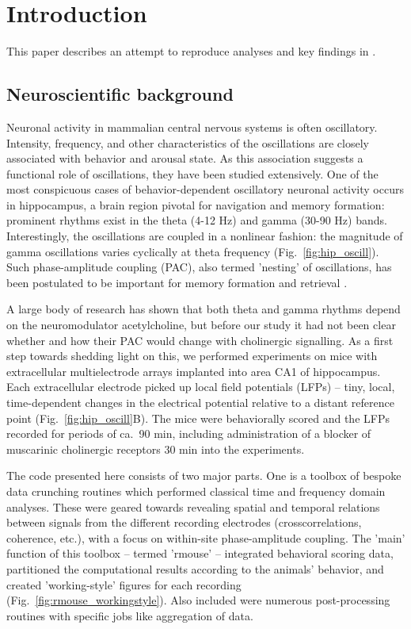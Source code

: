 \section{Introduction}
This paper describes an attempt to reproduce analyses and key findings in \cite{hentschke_muscarinic_2007}.
\subsection{Neuroscientific background}
\label{subsec:background}
Neuronal activity in mammalian central nervous systems is often oscillatory. Intensity, frequency, and other characteristics of the oscillations are closely associated with behavior and arousal state. As this association suggests a functional role of oscillations, they have been studied extensively. One of the most conspicuous cases of behavior-dependent oscillatory neuronal activity occurs in hippocampus, a brain region pivotal for navigation and memory formation: prominent rhythms exist in the theta (4-12 Hz) and gamma (30-90 Hz) bands. 
Interestingly, the oscillations are coupled in a nonlinear fashion: the magnitude of gamma oscillations varies cyclically at theta frequency \cite{soltesz_low-_1993} (Fig.~\ref{fig:hip_oscill}). Such phase-amplitude coupling (PAC), also termed 'nesting' of oscillations, has been postulated to be important for memory formation and retrieval \cite{lisman_storage_1995, hyafil_neural_2015}.

A large body of research has shown that both theta and gamma rhythms depend on the neuromodulator acetylcholine, but before our study \cite{hentschke_muscarinic_2007} it had not been clear whether and how their PAC would change with cholinergic signalling. As a first step towards shedding light on this, we performed experiments on mice with extracellular multielectrode arrays implanted into area CA1 of hippocampus. Each extracellular electrode picked up local field potentials (LFPs) -- tiny, local, time-dependent changes in the electrical potential relative to a distant reference point (Fig.~\ref{fig:hip_oscill}B). The mice were behaviorally scored and the LFPs recorded for periods of ca.\ 90 min, including administration of a blocker of muscarinic cholinergic receptors 30 min into the experiments. 

The code presented here consists of two major parts. One is a toolbox of bespoke data crunching routines which performed classical time and frequency domain analyses. These were geared towards revealing spatial and temporal relations between signals from the different recording electrodes (crosscorrelations, coherence, etc.), with a focus on within-site phase-amplitude coupling. The 'main' function of this toolbox -- termed 'rmouse' -- integrated behavioral scoring data, partitioned the computational results according to the animals' behavior, and created 'working-style' figures for each recording (Fig.~\ref{fig:rmouse_workingstyle}). Also included were numerous post-processing routines with specific jobs like aggregation of data.

